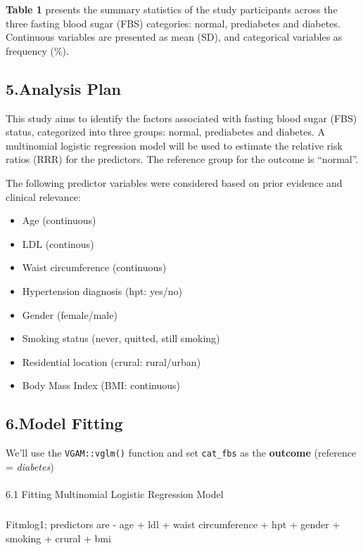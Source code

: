 \documentclass[
  letterpaper,
  DIV=11,
  numbers=noendperiod]{scrartcl}
\makeatletter
\let\oldparagraph\paragraph
\renewcommand{\paragraph}{
    \@ifstar
      \xxxParagraphStar
      \xxxParagraphNoStar
  }
\newcommand{\xxxParagraphStar}[1]{\oldparagraph*{#1}\mbox{}}
\newcommand{\xxxParagraphNoStar}[1]{\oldparagraph{#1}\mbox{}}
\let\oldsubparagraph\subparagraph
\renewcommand{\subparagraph}{
    \@ifstar
      \xxxSubParagraphStar
      \xxxSubParagraphNoStar
  }
\newcommand{\xxxSubParagraphStar}[1]{\oldsubparagraph*{#1}\mbox{}}
\newcommand{\xxxSubParagraphNoStar}[1]{\oldsubparagraph{#1}\mbox{}}
\makeatother
\begin{document}
\textbf{Table 1} presents the summary statistics of the study
participants across the three fasting blood sugar (FBS) categories:
normal, prediabetes and diabetes. Continuous variables are presented as
mean (SD), and categorical variables as frequency (\%).

\subsection{5.Analysis Plan}\label{analysis-plan}

This study aims to identify the factors associated with fasting blood
sugar (FBS) status, categorized into three groups: normal, prediabetes
and diabetes. A multinomial logistic regression model will be used to
estimate the relative risk ratios (RRR) for the predictors. The
reference group for the outcome is ``normal''.

The following predictor variables were considered based on prior
evidence and clinical relevance:

\begin{itemize}
\item
  Age (continuous)
\item
  LDL (continous)
\item
  Waist circumference (continuous)
\item
  Hypertension diagnosis (hpt: yes/no)
\item
  Gender (female/male)
\item
  Smoking status (never, quitted, still smoking)
\item
  Residential location (crural: rural/urban)
\item
  Body Mass Index (BMI: continuous)
\end{itemize}

\subsection{6.Model Fitting}\label{model-fitting}

We'll use the \texttt{VGAM::vglm()} function and set \texttt{cat\_fbs}
as the \textbf{outcome} (reference = \emph{diabetes})

\paragraph{6.1 Fitting Multinomial Logistic Regression
Model}\label{fitting-multinomial-logistic-regression-model}

\subparagraph{Fitmlog1; predictors are - age + ldl + waist circumference
+ hpt + gender + smoking + crural +
bmi}\label{fitmlog1-predictors-are---age-ldl-waist-circumference-hpt-gender-smoking-crural-bmi}
\end{document}
